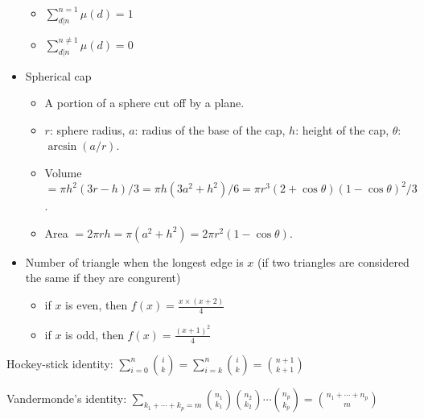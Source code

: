 \documentclass[10pt, a4paper, twocolumn, oneside]{article}
\begin{document}
\begin{itemize}
\begin{itemize}
  \item $\sum_{d \vert n}^{n=1} \mu (d)  = 1$
  \item $\sum_{d \vert n}^{n \neq 1} \mu (d)  = 0$
\end{itemize}
\item Spherical cap
\begin{itemize}
    \itemsep-0.5em
  \item A portion of a sphere cut off by a plane.
  \item $r$: sphere radius, $a$: radius of the base of the cap, $h$: height of the cap, $\theta$: $\arcsin(a/r)$.
  \item Volume $=\pi h^2(3r-h)/3=\pi h(3a^2+h^2)/6=\pi r^3(2+\cos\theta)(1-\cos\theta)^2/3$.
  \item Area $=2\pi rh=\pi(a^2+h^2)=2\pi r^2(1-\cos\theta)$.
\end{itemize}
\item Number of triangle when the longest edge is $x$ (if two triangles are considered the same if they are congurent)
\begin{itemize}
    \itemsep-0.5em
  \item if $x$ is even, then $f(x) = \frac{x \times (x + 2)}{4}$
  \item if $x$ is odd, then $f(x) = \frac{(x + 1)^2}{4}$
\end{itemize}
\end{itemize}
\item Hockey-stick identity: $\displaystyle\sum_{i = 0}^n {i\choose k} = \displaystyle\sum_{i = k}^n {i \choose k} = {{n + 1}\choose{k + 1}}$
\item Vandermonde's identity: $\displaystyle\sum_{k_1 + \cdots + k_p = m} {{n_1}\choose{k_1}}{{n_2}\choose{k_2}} \cdots {{n_p}\choose{k_p}} = {{n_1 + \cdots + n_p}\choose m}$
\end{document}
